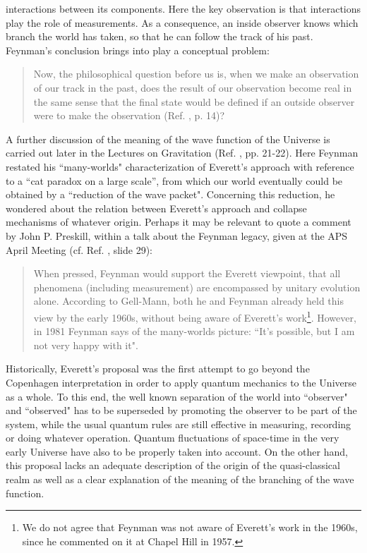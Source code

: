 \documentclass{ws-procs961x669}            %
\begin{document}
interactions between its components. Here the key observation is
that interactions play the role of measurements. As a consequence,
an inside observer knows which branch the world has taken, so that
he can follow the track of his past. Feynman's conclusion brings
into play a conceptual problem:
%
\begin{quote}
Now, the philosophical question before us is, when we make an
observation of our track in the past, does the result of our
observation become real in the same sense that the final state
would be defined if an outside observer were to make the
observation (Ref. , p. 14)?
\end{quote}
%
A further discussion of the meaning of the wave function of the
Universe is carried out later in the Lectures on Gravitation (Ref.
, pp. 21-22). Here Feynman restated his
``many-worlds" characterization of Everett's approach with
reference to a ``cat paradox on a large scale'', from which our
world eventually could be obtained by a ``reduction of the wave
packet". Concerning this reduction, he wondered about the relation
between Everett's approach and collapse mechanisms of whatever
origin. Perhaps it may be relevant to quote a comment by John P.
Preskill, within a talk about the Feynman legacy, given at the APS
April Meeting (cf. Ref. , slide 29):
%
\begin{quote}
When pressed, Feynman would support the Everett viewpoint, that
all phenomena (including measurement) are encompassed by unitary
evolution alone. According to Gell-Mann, both he and Feynman
already held this view by the early 1960s, without being aware of
Everett's work\footnote{We do not agree that Feynman was not aware
of Everett's work in the 1960s, since he commented on it at Chapel
Hill in 1957.}. However, in 1981 Feynman says of the many-worlds
picture: ``It's possible, but I am not very happy with it".
\end{quote}
%

Historically, Everett's proposal \cite{Everett} was the first
attempt to go beyond the Copenhagen interpretation in order to
apply quantum mechanics to the Universe as a whole. To this end,
the well known separation of the world into ``observer" and
``observed" has to be superseded by promoting the observer to be
part of the system, while the usual quantum rules are still
effective in measuring, recording or doing whatever operation.
Quantum fluctuations of space-time in the very early Universe have
also to be properly taken into account. On the other hand, this
proposal lacks an adequate description of the origin of the
quasi-classical realm as well as a clear explanation of the
meaning of the branching of the wave function.
\end{document}
